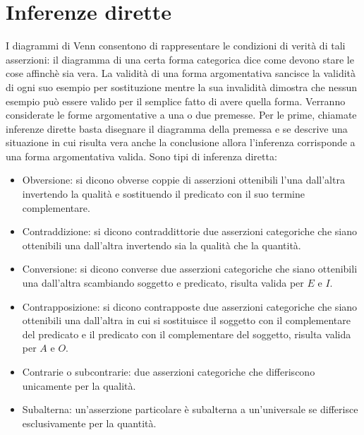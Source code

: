 \section{Inferenze dirette}
I diagrammi di Venn consentono di rappresentare le condizioni di verit\`a di tali asserzioni: il diagramma di una certa forma categorica dice come devono stare le cose affinch\`e sia vera. La validit\`a di una forma 
argomentativa sancisce la validit\`a di ogni suo esempio per sostituzione mentre la sua invalidit\`a dimostra che nessun esempio pu\`o essere valido per il semplice fatto di avere quella forma. Verranno 
considerate le forme argomentative a una o due premesse. Per le prime, chiamate inferenze dirette basta disegnare il diagramma della premessa e se descrive una situazione in cui risulta vera anche la 
conclusione allora l'inferenza corrisponde a una forma argomentativa valida. Sono tipi di inferenza diretta:
\begin{itemize}
\item Obversione: si dicono obverse coppie di asserzioni ottenibili l'una dall'altra invertendo la qualit\`a e sostituendo il predicato con il suo termine complementare.
\item Contraddizione: si dicono contraddittorie due asserzioni categoriche che siano ottenibili una dall'altra invertendo sia la qualit\`a che la quantit\`a.
\item Conversione: si dicono converse due asserzioni categoriche che siano ottenibili una dall'altra scambiando soggetto e predicato, risulta valida per $E$ e $I$.
\item  Contrapposizione: si dicono contrapposte due asserzioni categoriche che siano ottenibili una dall'altra in cui si sostituisce il soggetto con il complementare del predicato e il predicato con il 
complementare del soggetto, risulta valida per $A$ e $O$. 
\item Contrarie o subcontrarie: due asserzioni categoriche che differiscono unicamente per la qualit\`a.
\item Subalterna: un'asserzione particolare \`e subalterna a un'universale se differisce esclusivamente per la quantit\`a.
\end{itemize}
